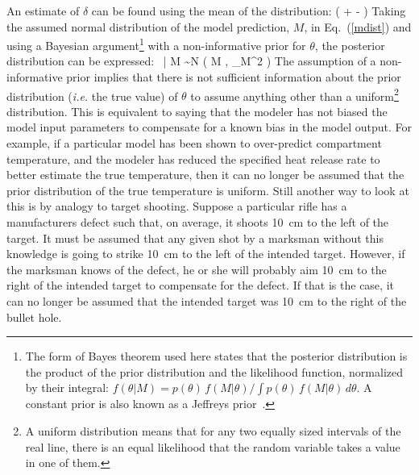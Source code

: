 An estimate of $\delta$ can be found using the mean of the distribution:
\be
   \delta \approx \exp \left(  + - \right) \label{delta}
\ee
Taking the assumed normal distribution of the model prediction, $M$, in Eq.~(\ref{mdist}) and using
a Bayesian argument\footnote{The form of Bayes theorem used here states that the posterior distribution is the product of
the prior distribution and the likelihood function, normalized by their integral:
$f(\theta|M)= p(\theta) \, f(M|\theta)/\int p(\theta) \, f(M|\theta) \, d\theta$.
A constant prior is also known as a Jeffreys prior~\cite{Gelman:Stats}.}
with a non-informative prior for $\theta$, the posterior distribution can be expressed:
\be
   \delta \, \theta \; | \; M \sim N \left( M \; , \; \sigma_M^2 \right) \label{thetaeq}
\ee
The assumption of a non-informative prior implies that there is not sufficient information about the
prior distribution ({\em i.e.} the true value) of
$\theta$ to assume anything other than a uniform\footnote{A uniform distribution means that for any two equally sized intervals of the real line,
there is an equal likelihood that the random variable takes a value in one of them.} distribution.
This is equivalent to saying that the modeler has not biased the model input parameters to compensate for a known
bias in the model output. For example, if a particular model has been shown to over-predict compartment temperature, and the modeler has reduced the specified heat release
rate to better estimate the true temperature, then it can no longer be assumed that the prior distribution of the true temperature is uniform.
Still another way to look at this is by analogy to target shooting. Suppose a particular rifle
has a manufacturers defect such that, on average, it shoots 10~cm to the left of the target. It must be assumed that any given shot by a marksman without this knowledge is
going to strike 10~cm to the left of the intended target. However, if the marksman knows of the defect, he or she will probably aim 10~cm to the right of the
intended target to compensate for the defect. If that is the case, it can no longer be assumed that the intended target was 10~cm to the right of the bullet hole.

